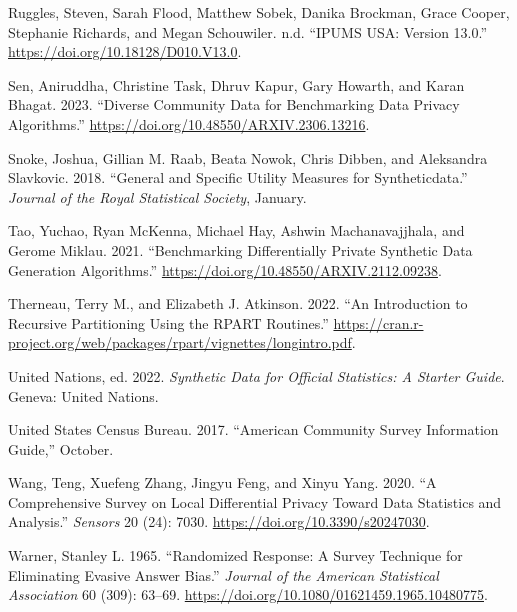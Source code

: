 \documentclass[
]{urban-formatting}
\newlength{\cslhangindent}
\newlength{\cslentryspacingunit} %
\newenvironment{CSLReferences}[2] %
 {%
  \setlength{\parindent}{0pt}
  \ifodd #1
  \let\oldpar\par
  \def\par{\hangindent=\cslhangindent\oldpar}
  \fi
  \setlength{\parskip}{#2\cslentryspacingunit}
 }%
 {}
\begin{document}
\begin{CSLReferences}{1}{0}
\leavevmode{}%
Ruggles, Steven, Sarah Flood, Matthew Sobek, Danika Brockman, Grace
Cooper, Stephanie Richards, and Megan Schouwiler. n.d. {``IPUMS USA:
Version 13.0.''} \url{https://doi.org/10.18128/D010.V13.0}.

\leavevmode{}%
Sen, Aniruddha, Christine Task, Dhruv Kapur, Gary Howarth, and Karan
Bhagat. 2023. {``Diverse Community Data for Benchmarking Data Privacy
Algorithms.''} \url{https://doi.org/10.48550/ARXIV.2306.13216}.

\leavevmode{}%
Snoke, Joshua, Gillian M. Raab, Beata Nowok, Chris Dibben, and
Aleksandra Slavkovic. 2018. {``General and Specific Utility Measures for
Syntheticdata.''} \emph{Journal of the Royal Statistical Society},
January.

\leavevmode{}%
Tao, Yuchao, Ryan McKenna, Michael Hay, Ashwin Machanavajjhala, and
Gerome Miklau. 2021. {``Benchmarking Differentially Private Synthetic
Data Generation Algorithms.''}
\url{https://doi.org/10.48550/ARXIV.2112.09238}.

\leavevmode{}%
Therneau, Terry M., and Elizabeth J. Atkinson. 2022. {``An Introduction
to Recursive Partitioning Using the RPART Routines.''}
\url{https://cran.r-project.org/web/packages/rpart/vignettes/longintro.pdf}.

\leavevmode{}%
United Nations, ed. 2022. \emph{Synthetic Data for Official Statistics:
A Starter Guide}. Geneva: United Nations.

\leavevmode{}%
United States Census Bureau. 2017. {``American Community Survey
Information Guide,''} October.

\leavevmode{}%
Wang, Teng, Xuefeng Zhang, Jingyu Feng, and Xinyu Yang. 2020. {``A
Comprehensive Survey on Local Differential Privacy Toward Data
Statistics and Analysis.''} \emph{Sensors} 20 (24): 7030.
\url{https://doi.org/10.3390/s20247030}.

\leavevmode{}%
Warner, Stanley L. 1965. {``Randomized Response: A Survey Technique for
Eliminating Evasive Answer Bias.''} \emph{Journal of the American
Statistical Association} 60 (309): 63--69.
\url{https://doi.org/10.1080/01621459.1965.10480775}.


\end{CSLReferences}
\end{document}
